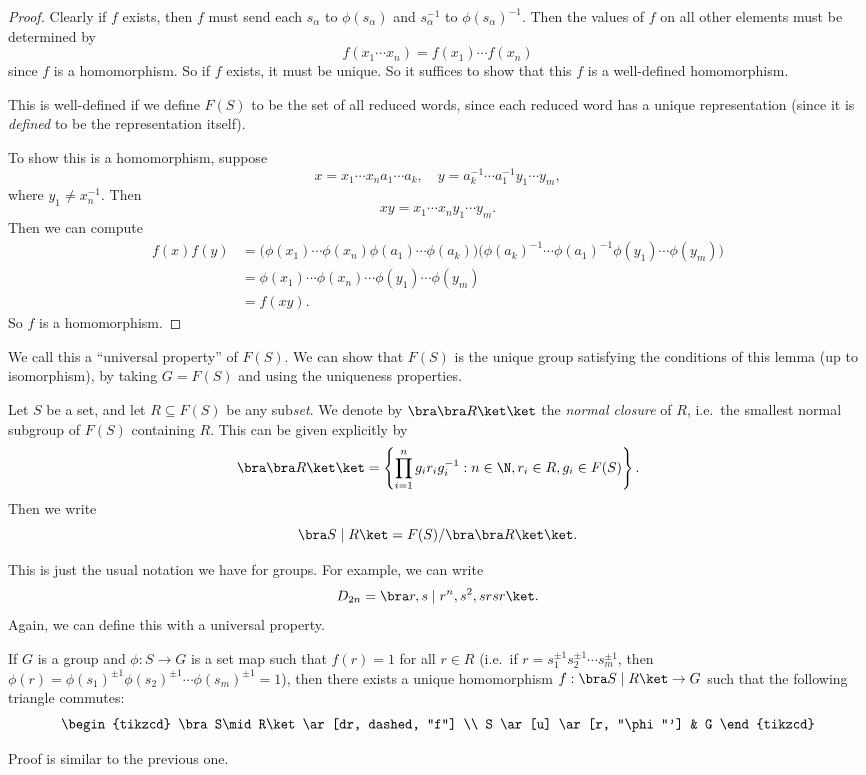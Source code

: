 \documentclass[a4paper]{article}
\begin{document}
\begin{proof}
  Clearly if $f$ exists, then $f$ must send each $s_\alpha$ to $\phi(s_\alpha)$ and $s_\alpha^{-1}$ to $\phi(s_\alpha)^{-1}$. Then the values of $f$ on all other elements must be determined by
  \[
    f(x_1\cdots x_n) = f(x_1)\cdots f(x_n)
  \]
  since $f$ is a homomorphism. So if $f$ exists, it must be unique. So it suffices to show that this $f$ is a well-defined homomorphism.

  This is well-defined if we define $F(S)$ to be the set of all reduced words, since each reduced word has a unique representation (since it is \emph{defined} to be the representation itself).

  To show this is a homomorphism, suppose
  \[
    x = x_1\cdots x_n a_1\cdots a_k,\quad y = a_k^{-1} \cdots a_1^{-1} y_1\cdots y_m,
  \]
  where $y_1 \not= x_n^{-1}$. Then
  \[
    xy = x_1 \cdots x_n y_1\cdots y_m.
  \]
  Then we can compute
  \begin{align*}
    f(x)f(y) &= \big(\phi(x_1)\cdots \phi(x_n) \phi(a_1) \cdots \phi(a_k)\big) \big(\phi(a_k)^{-1} \cdots \phi(a_1)^{-1}\phi(y_1)\cdots\phi(y_m)\big) \\
    &= \phi(x_1)\cdots\phi(x_n) \cdots \phi(y_1)\cdots \phi(y_m) \\
    &= f(xy).
  \end{align*}
  So $f$ is a homomorphism.
\end{proof}
We call this a ``universal property'' of $F(S)$. We can show that $F(S)$ is the unique group satisfying the conditions of this lemma (up to isomorphism), by taking $G = F(S)$ and using the uniqueness properties.

\begin{defi}
  Let $S$ be a set, and let $R \subseteq F(S)$ be any sub\emph{set}. We denote by $\bra \bra R\ket\ket$ the \emph{normal closure} of $R$, i.e.\ the smallest normal subgroup of $F(S)$ containing $R$. This can be given explicitly by
  \[
    \bra \bra R\ket \ket = \left\{\prod_{i = 1}^n g_i r_i g_i^{-1}: n \in \N, r_i \in R, g_i \in F(S)\right\}.
  \]
  Then we write
  \[
    \bra S \mid R\ket = F(S)/\bra\bra R\ket\ket.
  \]
\end{defi}
This is just the usual notation we have for groups. For example, we can write
\[
  D_{2n} = \bra r, s \mid r^n, s^2, srsr\ket.
\]
Again, we can define this with a universal property.
\begin{lemma}
  If $G$ is a group and $\phi: S \to G$ is a set map such that $f(r) = 1$ for all $r \in R$ (i.e.\ if $r = s_1^{\pm 1}s_2^{\pm 1}\cdots s_m^{\pm 1}$, then $\phi(r) = \phi(s_1)^{\pm 1}\phi(s_2)^{\pm 1} \cdots \phi(s_m)^{\pm 1} = 1$), then there exists a unique homomorphism $f: \bra S \mid R\ket \to G$ such that the following triangle commutes:
  \[
    \begin{tikzcd}
      \bra S\mid R\ket \ar[dr, dashed, "f"] \\
      S \ar[u] \ar[r, "\phi"'] & G
    \end{tikzcd}
  \]
\end{lemma}
Proof is similar to the previous one.
\end{document}
